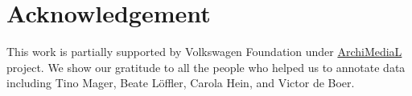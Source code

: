 \documentclass[a4paper,conference]{IEEEtran}
\begin{document}
\section{Acknowledgement}
This work is partially supported by Volkswagen Foundation under \href{http://archimedial.eu/}{ArchiMediaL} project. We show our gratitude to all the people who helped us to annotate data including Tino Mager, Beate Löffler, Carola Hein, and Victor de Boer. 




































\end{document}
